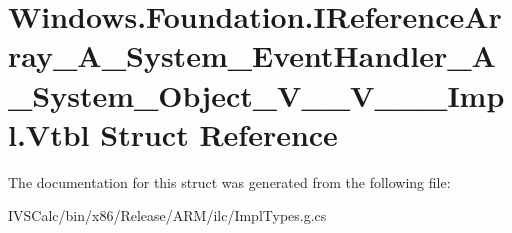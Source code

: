 \hypertarget{struct_windows_1_1_foundation_1_1_i_reference_array___a___system___event_handler___a___system___27d2bd1c6905cfb8501b3d6b75dd7afa}{}\section{Windows.\+Foundation.\+I\+Reference\+Array\+\_\+\+A\+\_\+\+System\+\_\+\+Event\+Handler\+\_\+\+A\+\_\+\+System\+\_\+\+Object\+\_\+\+V\+\_\+\+\_\+\+V\+\_\+\+\_\+\+\_\+\+Impl.\+Vtbl Struct Reference}
\label{struct_windows_1_1_foundation_1_1_i_reference_array___a___system___event_handler___a___system___27d2bd1c6905cfb8501b3d6b75dd7afa}


The documentation for this struct was generated from the following file\+:\begin{DoxyCompactItemize}
\item 
I\+V\+S\+Calc/bin/x86/\+Release/\+A\+R\+M/ilc/Impl\+Types.\+g.\+cs\end{DoxyCompactItemize}
